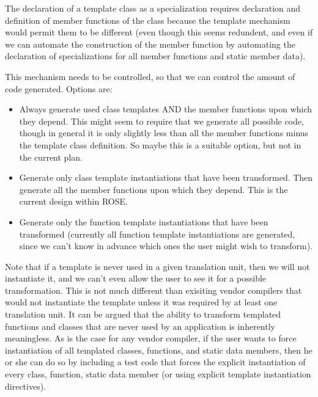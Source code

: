 \begin{enumerate}
\begin{itemize}
                     The declaration of a template class as a
                     specialization requires declaration and definition of member
                     functions of the class because the template mechanism would permit 
                     them to be different (even though this seems redundent, and even if
                     we can automate the construction of the member function by automating 
                     the declaration of specializations for all member functions and
                     static member data).

                     This mechanism needs to be controlled, so that we can control the
                     amount of code generated.  Options are:
                     \begin{itemize}
                         \item Always generate used class templates AND the member
                               functions upon which they depend.  This might seem to
                               require that we generate all possible code, though in general
                               it is only slightly less than all the member
                               functions minus the template class definition.  So maybe
                               this is a suitable option, but not in the current plan.
                         \item Generate only class template instantiations that have been 
                               transformed. Then generate
                               all the member functions upon which they depend. This is
                               the current design within ROSE.
                         \item Generate only the function template instantiations that
                               have been transformed (currently all function template
                               instantiations are generated, since we can't know in
                               advance which ones the user might wish to transform).
                     \end{itemize}
                     Note that if a template is never used in a given translation unit, 
                     then we will not instantiate it, and we can't even allow the user to 
                     see it for a possible transformation.  This is not much different
                     than exisiting vendor compilers that would not instantiate the template 
                     unless it was required by at least one translation unit.  It can be 
                     argued that the ability to transform templated functions and classes 
                     that are never used by an application is inherently meaningless. As is
                     the case for any vendor compiler, if the user wants to force
                     instantiation of all templated classes, functions, and static data 
                     members, then he or she can do so by including a test code 
                     that forces the explicit instantiation of every class, function,
                     static data member (or using explicit template instantiation directives).


\end{itemize}
\end{enumerate}

